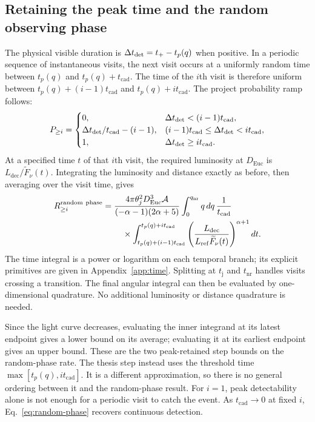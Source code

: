 \documentclass[11pt,a4paper]{article}
\newcommand{\Euc}{\mathrm{Euc}}
\newcommand{\nr}{\mathrm{nr}}
\newcommand{\Lref}{L_{\mathrm{ref}}}
\newcommand{\Ldec}{L_{\mathrm{dec}}}
\newcommand{\tcad}{t_{\mathrm{cad}}}
\newcommand{\tj}{t_{\mathrm j}}
\newcommand{\tnr}{t_{\mathrm{nr}}}
\newcommand{\ft}{\widetilde F_\nu}
\begin{document}
\subsection{Retaining the peak time and the random observing phase}
The physical visible duration is $\Delta t_{\rm det}=t_+-t_p(q)$ when
positive. In a periodic sequence of instantaneous visits, the next visit
occurs at a uniformly random time between $t_p(q)$ and $t_p(q)+\tcad$.
The time of the $i$th visit is therefore uniform between
$t_p(q)+(i-1)\tcad$ and $t_p(q)+i\tcad$.
The project probability ramp follows:
\begin{equation}
 P_{\ge i}=\begin{cases}
 0,&\Delta t_{\rm det}<(i-1)\tcad,\\
 \Delta t_{\rm det}/\tcad-(i-1),
       &(i-1)\tcad\le\Delta t_{\rm det}<i\tcad,\\
 1,&\Delta t_{\rm det}\ge i\tcad.
 \end{cases}
 \label{eq:ramp}
\end{equation}
At a specified time $t$ of that $i$th visit, the required luminosity at
$D_\Euc$ is $\Ldec/\ft(t)$. Integrating the luminosity and distance exactly
as before, then averaging over the visit time, gives
\begin{equation}
\begin{aligned}
 R_{\ge i}^{\rm random\ phase}={}&
 \frac{4\pi\theta_j^2D_\Euc^3\mathcal A}
 {(-\alpha-1)(2\alpha+5)}
 \int_0^{q_\nr}q\,dq\,\frac1{\tcad}\\
 &\quad\times\int_{t_p(q)+(i-1)\tcad}^{t_p(q)+i\tcad}
 \left(\frac{\Ldec}{\Lref\ft(t)}\right)^{\alpha+1}dt.
\end{aligned}
\label{eq:random-phase}
\end{equation}
The time integral is a power or logarithm on each temporal branch; its
explicit primitives are given in Appendix~\ref{app:time}.
Splitting at $\tj$ and $\tnr$ handles visits crossing a transition.
The final angular integral can then be evaluated by one-dimensional
quadrature. No additional luminosity or distance quadrature is needed.

Since the light curve decreases, evaluating the inner integrand at its
latest endpoint gives a lower bound on its average; evaluating it at its
earliest endpoint gives an upper bound. These are the two peak-retained
step bounds on the random-phase rate. The thesis step instead uses the
threshold time $\max[t_p(q),i\tcad]$. It is a different approximation,
so there is no general ordering between it and the random-phase result.
For $i=1$, peak detectability alone is not enough for a periodic visit to
catch the event. As $\tcad\to0$ at fixed $i$, Eq.~\eqref{eq:random-phase}
recovers continuous detection.
\end{document}
